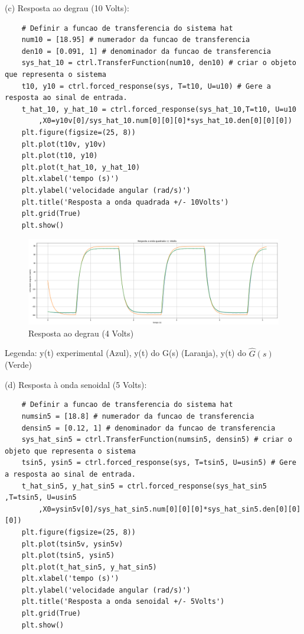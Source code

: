 \documentclass[10pt]{article}
\begin{document}
(c) Resposta ao degrau (10 Volts):

\begin{verbatim}
    # Definir a funcao de transferencia do sistema hat
    num10 = [18.95] # numerador da funcao de transferencia
    den10 = [0.091, 1] # denominador da funcao de transferencia
    sys_hat_10 = ctrl.TransferFunction(num10, den10) # criar o objeto que representa o sistema
    t10, y10 = ctrl.forced_response(sys, T=t10, U=u10) # Gere a resposta ao sinal de entrada.
    t_hat_10, y_hat_10 = ctrl.forced_response(sys_hat_10,T=t10, U=u10
        ,X0=y10v[0]/sys_hat_10.num[0][0][0]*sys_hat_10.den[0][0][0])
    plt.figure(figsize=(25, 8))
    plt.plot(t10v, y10v)
    plt.plot(t10, y10)
    plt.plot(t_hat_10, y_hat_10)
    plt.xlabel('tempo (s)')
    plt.ylabel('velocidade angular (rad/s)')
    plt.title('Resposta a onda quadrada +/- 10Volts')
    plt.grid(True)
    plt.show()
\end{verbatim}

\begin{figure}[h]
    \centering
    \includegraphics[scale=0.32]{resposta4.png}
    \caption{Resposta ao degrau (4 Volts)}
\end{figure}

\quad Legenda: y(t) experimental (Azul), y(t) do G(s) (Laranja), y(t) do $\hat{G}(s)$ (Verde)

(d) Resposta à onda senoidal (5 Volts):

\begin{verbatim}
    # Definir a funcao de transferencia do sistema hat
    numsin5 = [18.8] # numerador da funcao de transferencia
    densin5 = [0.12, 1] # denominador da funcao de transferencia
    sys_hat_sin5 = ctrl.TransferFunction(numsin5, densin5) # criar o objeto que representa o sistema
    tsin5, ysin5 = ctrl.forced_response(sys, T=tsin5, U=usin5) # Gere a resposta ao sinal de entrada.
    t_hat_sin5, y_hat_sin5 = ctrl.forced_response(sys_hat_sin5 ,T=tsin5, U=usin5
        ,X0=ysin5v[0]/sys_hat_sin5.num[0][0][0]*sys_hat_sin5.den[0][0][0])
    plt.figure(figsize=(25, 8))
    plt.plot(tsin5v, ysin5v)
    plt.plot(tsin5, ysin5)
    plt.plot(t_hat_sin5, y_hat_sin5)
    plt.xlabel('tempo (s)')
    plt.ylabel('velocidade angular (rad/s)')
    plt.title('Resposta a onda senoidal +/- 5Volts')
    plt.grid(True)
    plt.show()
\end{verbatim}
\end{document}

